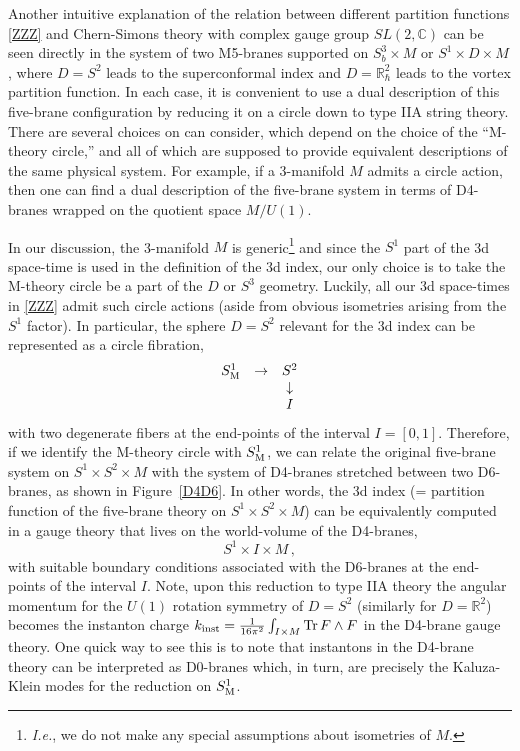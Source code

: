 \documentclass[11pt,letterpaper]{article}
\numberwithin{equation}{section}
\newcommand{\be}{\begin{equation}}
\newcommand{\ee}{\end{equation}}
\newcommand{\R}{{\mathbb R}}
\newcommand{\C}{{\mathbb C}}
\newcommand{\Tr}{{\rm Tr \,}}
\begin{document}
Another intuitive explanation of the relation between different partition functions \eqref{ZZZ}
and Chern-Simons theory with complex gauge group $SL(2,\C)$
can be seen directly in the system of two M5-branes supported on
$S^3_b \times M$ or $S^1 \times D \times M$, where $D = S^2$ leads to the superconformal index
and $D = \R^2_{\hbar}$ leads to the vortex partition function.
In each case, it is convenient to use a dual description of this five-brane configuration
by reducing it on a circle down to type IIA string theory.
There are several choices on can consider, which depend on the choice of the ``M-theory circle,''
and all of which are supposed to provide equivalent descriptions of the same physical system.
For example, if a 3-manifold $M$ admits a circle action, then one can find a dual description
of the five-brane system in terms of D4-branes wrapped on the quotient space $M/U(1)$.

In our discussion, the 3-manifold $M$ is generic\footnote{\emph{I.e.}, we do not make any special assumptions
about isometries of $M$.} and since the $S^1$ part of the 3d space-time
is used in the definition of the 3d index, our only choice is to take the M-theory circle be a part of the $D$ or $S^3$ geometry.
Luckily, all our 3d space-times in \eqref{ZZZ} admit such circle actions (aside from obvious isometries arising from the $S^1$ factor).
In particular, the sphere $D = S^2$ relevant for the 3d index can be represented as a circle fibration,
\be
\begin{matrix}
S^1_{\rm M} & \to & S^2 \\
& & \downarrow \\
& & I
\end{matrix}
\ee
with two degenerate fibers at the end-points of the interval $I = [0,1]$.
Therefore, if we identify the M-theory circle with $S^1_{\rm M}$,
we can relate the original five-brane system on $S^1 \times S^2 \times M$
with the system of D4-branes stretched between two D6-branes, as shown in Figure~\ref{D4D6}.
In other words, the 3d index (= partition function of the five-brane theory on $S^1 \times S^2 \times M$)
can be equivalently computed in a gauge theory that lives on the world-volume of the D4-branes,
\be
S^1 \times I \times M \,,
\ee
with suitable boundary conditions associated with the D6-branes at the end-points of the interval $I$.
Note, upon this reduction to type IIA theory the angular momentum for the $U(1)$ rotation symmetry
of $D = S^2$ (similarly for $D = \R^2$) becomes the instanton charge $k_{\text{inst}} = \frac{1}{16 \pi^2} \int_{I \times M} \Tr F \wedge F$
in the D4-brane gauge theory. One quick way to see this is to note that instantons in
the D4-brane theory can be interpreted as D0-branes which, in turn, are precisely the Kaluza-Klein modes
for the reduction on $S^1_{\rm M}$.
\end{document}
